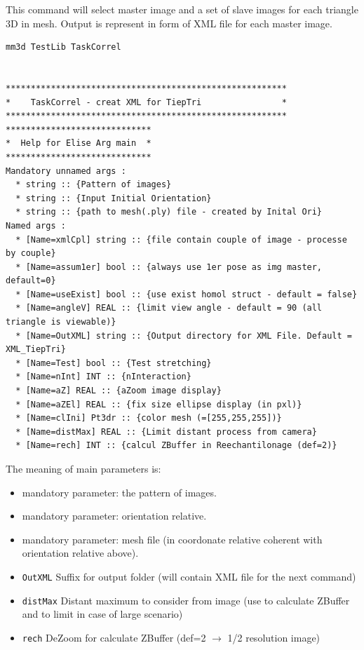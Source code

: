 This command will select master image and a set of slave images for each triangle 3D in mesh.
Output is represent in form of XML file for each master image.

\begin{verbatim}
mm3d TestLib TaskCorrel


********************************************************
*    TaskCorrel - creat XML for TiepTri                *
********************************************************
*****************************
*  Help for Elise Arg main  *
*****************************
Mandatory unnamed args : 
  * string :: {Pattern of images}
  * string :: {Input Initial Orientation}
  * string :: {path to mesh(.ply) file - created by Inital Ori}
Named args : 
  * [Name=xmlCpl] string :: {file contain couple of image - processe by couple}
  * [Name=assum1er] bool :: {always use 1er pose as img master, default=0}
  * [Name=useExist] bool :: {use exist homol struct - default = false}
  * [Name=angleV] REAL :: {limit view angle - default = 90 (all triangle is viewable)}
  * [Name=OutXML] string :: {Output directory for XML File. Default = XML_TiepTri}
  * [Name=Test] bool :: {Test stretching}
  * [Name=nInt] INT :: {nInteraction}
  * [Name=aZ] REAL :: {aZoom image display}
  * [Name=aZEl] REAL :: {fix size ellipse display (in pxl)}
  * [Name=clIni] Pt3dr :: {color mesh (=[255,255,255])}
  * [Name=distMax] REAL :: {Limit distant process from camera}
  * [Name=rech] INT :: {calcul ZBuffer in Reechantilonage (def=2)}

\end{verbatim}

The meaning of main parameters is:

\begin{itemize}
   \item mandatory parameter: the pattern of images.
   
   \item mandatory parameter: orientation relative.
   
   \item mandatory parameter: mesh file (in coordonate relative coherent with orientation relative above).

   \item  {\tt OutXML} Suffix for output folder (will contain XML file for the next command)

   \item  {\tt distMax} Distant maximum to consider from image (use to calculate ZBuffer and to limit in case of large scenario) 

   \item  {\tt rech} DeZoom for calculate ZBuffer (def=2 $\rightarrow$ 1/2 resolution image)

\end{itemize}



